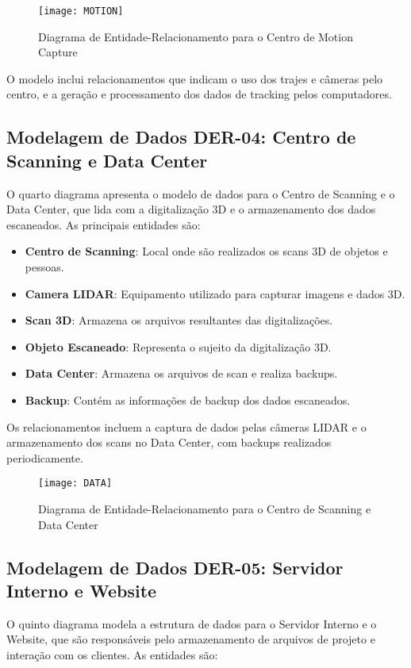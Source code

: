 \begin{figure}[ht]
    \centering
    \texttt{[image: MOTION]}
    \caption{Diagrama de Entidade-Relacionamento para o Centro de Motion Capture}
    \label{fig:motion}
\end{figure}

O modelo inclui relacionamentos que indicam o uso dos trajes e câmeras pelo centro, e a geração e processamento dos dados de tracking pelos computadores.

\subsection{Modelagem de Dados DER-04: Centro de Scanning e Data Center}
O quarto diagrama apresenta o modelo de dados para o Centro de Scanning e o Data Center, que lida com a digitalização 3D e o armazenamento dos dados escaneados. As principais entidades são:

\begin{itemize}
    \item \textbf{Centro de Scanning}: Local onde são realizados os scans 3D de objetos e pessoas.
    \item \textbf{Camera LIDAR}: Equipamento utilizado para capturar imagens e dados 3D.
    \item \textbf{Scan 3D}: Armazena os arquivos resultantes das digitalizações.
    \item \textbf{Objeto Escaneado}: Representa o sujeito da digitalização 3D.
    \item \textbf{Data Center}: Armazena os arquivos de scan e realiza backups.
    \item \textbf{Backup}: Contém as informações de backup dos dados escaneados.
\end{itemize}

Os relacionamentos incluem a captura de dados pelas câmeras LIDAR e o armazenamento dos scans no Data Center, com backups realizados periodicamente.

\begin{figure}[ht]
    \centering
    \texttt{[image: DATA]}
    \caption{Diagrama de Entidade-Relacionamento para o Centro de Scanning e Data Center}
    \label{fig:data}
\end{figure}

\subsection{Modelagem de Dados DER-05: Servidor Interno e Website}
O quinto diagrama modela a estrutura de dados para o Servidor Interno e o Website, que são responsáveis pelo armazenamento de arquivos de projeto e interação com os clientes. As entidades são:


